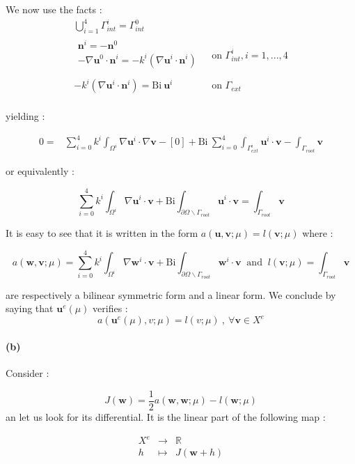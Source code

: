 \documentclass[a4paper]{article}
\newcounter{c}
\newcounter{d}
\newcounter{r}
\newcounter{e}
\newcommand{\R}{\mathbb{R}}
\newcommand{\bu}{\mathbf u}
\newcommand{\bv}{\mathbf v}
\newcommand{\bw}{\mathbf w}
\begin{document}
We now use the facts :
$$\begin{array}{ll}
\displaystyle\bigcup_{i=1}^4\Gamma^i_{int}=\Gamma^0_{int}&\\
\begin{array}{l}\mathbf n^i=-\mathbf n^0\\
-\nabla\bu^0\cdot\mathbf n^i=-k^i(\nabla\bu^i\cdot\mathbf n^i)\\
\end{array}&\text{ on }\Gamma^i_{int}, i=1,...,4\\
-k^i(\nabla\bu^i\cdot\mathbf n^i)=\text{Bi}~\bu^i&\text{ on }\Gamma_{ext}\\
\end{array}$$

yielding :

$$\begin{array}{rl}0=&\displaystyle\sum_{i=0}^4k^i\int_{\Omega^i}\nabla\bu^i\cdot\nabla\bv-[0]+\text{Bi}~\sum_{i=0}^4\int_{\Gamma^i_{ext}}\bu^i\cdot\bv-\int_{\Gamma_{root}}\bv
\end{array}$$

or equivalently :

$$\sum_{i=0}^4k^i\int_{\Omega^i}\nabla\bu^i\cdot\bv+\text{Bi}\int_{\partial\Omega\backslash\Gamma_{root}}\bu^i\cdot\bv=\int_{\Gamma_{root}}\bv$$

It is easy to see that it is written in the form $a(\bu,\bv;\mu)=l(\bv;\mu)$ where :

$$a(\mathbf w,\bv;\mu)=\sum_{i=0}^4k^i\int_{\Omega^i}\nabla\mathbf w^i\cdot\bv+\text{Bi}\int_{\partial\Omega\backslash\Gamma_{root}}\mathbf w^i\cdot\bv~\text{ and }~l(\bv;\mu)=\int_{\Gamma_{root}}\bv$$

are respectively a bilinear symmetric form and a linear form. We conclude by saying that $\bu^e(\mu)$ verifies : $$a(\bu^e(\mu),v;\mu)=l(v;\mu)~,~\forall\bv\in X^e$$


\paragraph{(b)}Consider :

$$J(\mathbf w)=\frac12a(\mathbf w,\mathbf w;\mu)-l(\mathbf w;\mu)$$ an let us look for its differential. It is the linear part of the following map :

$$\begin{array}{rcl}
X^e&\longrightarrow&\R\\
h&\longmapsto&J(\bw+h)
\end{array}$$
\end{document}
